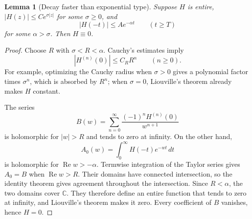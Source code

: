 \documentclass[11pt,reqno]{amsart}
\numberwithin{equation}{section}
\newtheorem{lemma}[theorem]{Lemma}
\theoremstyle{definition}
\theoremstyle{remark}
\newcommand{\C}{\mathbb C}
\begin{document}
\begin{lemma}[Decay faster than exponential type]\label{lem:ray}
Suppose $H$ is entire, $|H(z)|\le C e^{\sigma|z|}$ for some $\sigma\ge0$, and
\[
 |H(-t)|\le A e^{-\alpha t}\qquad(t\ge T)
\]
for some $\alpha>\sigma$. Then $H\equiv0$.
\end{lemma}
\begin{proof}
Choose $R$ with $\sigma<R<\alpha$. Cauchy's estimates imply
\[
 |H^{(n)}(0)|\le C_R R^n\qquad(n\ge0).
\]
For example, optimizing the Cauchy radius when $\sigma>0$ gives a polynomial factor times $\sigma^n$, which is absorbed by $R^n$; when $\sigma=0$, Liouville's theorem already makes $H$ constant.

The series
\[
 B(w)=\sum_{n=0}^{\infty}\frac{(-1)^nH^{(n)}(0)}{w^{n+1}}
\]
is holomorphic for $|w|>R$ and tends to zero at infinity. On the other hand,
\[
 A_0(w)=\int_0^{\infty}H(-t)e^{-wt}\,dt
\]
is holomorphic for $\operatorname{Re}w>-\alpha$. Termwise integration of the Taylor series gives $A_0=B$ when $\operatorname{Re}w>R$. Their domains have connected intersection, so the identity theorem gives agreement throughout the intersection. Since $R<\alpha$, the two domains cover $\C$. They therefore define an entire function that tends to zero at infinity, and Liouville's theorem makes it zero. Every coefficient of $B$ vanishes, hence $H=0$.
\end{proof}
\end{document}
